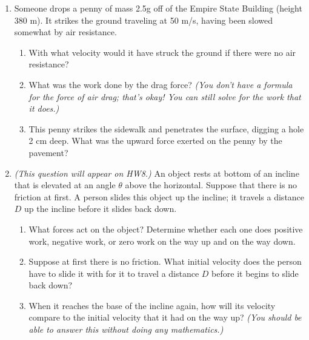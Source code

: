 \documentclass[12pt]{article}
\begin{document}
\newpage

\begin{enumerate}

\item{Someone drops a penny of mass 2.5g off of the Empire State Building (height 380 m). It strikes the ground traveling at 50 m/s, having been slowed somewhat by air resistance.}
\begin{enumerate}
	\item{With what velocity would it have struck the ground if there were no air resistance?}
	\vspace{2.5in}
	\item{What was the work done by the drag force? {\it (You don't have a formula for the force of air drag; that's okay! You can still solve for the work that it does.)}}
	\vspace{2.5in}
	\item{This penny strikes the sidewalk and penetrates the surface, digging a hole 2 cm deep. What was the upward force exerted on the penny by the pavement?}
	\vspace{2in}
\end{enumerate}

\newpage


\item{{\it (This question will appear on HW8.)} An object rests at bottom of an incline that is elevated at an angle $\theta$ above the horizontal. Suppose that there is no friction at first. A person slides this object up the incline; it travels a distance $D$ up the incline before it slides back down.}
	
	\begin{enumerate}
		
		\item What forces act on the object? Determine whether each one does positive work, negative work, or zero work on the way up and on the way down.

	
\item	Suppose at first there is no friction. What initial velocity does the person have to slide it with for it to travel a distance $D$ before it begins to slide back down? 
	
	\vspace{2in}
	
\item	When it reaches the base of the incline again, how will its velocity compare to the initial velocity that it had on the way up? {\it (You should be able to answer this without doing any mathematics.)}
	

\end{enumerate}
\end{enumerate}
\end{document}
